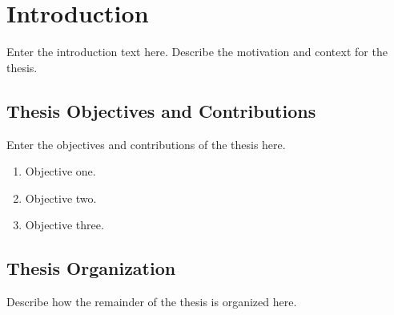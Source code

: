 
\newpage
{}



\chapter{Introduction}
\label{chap:introduction}

Enter the introduction text here. Describe the motivation and context for the thesis.

\section{Thesis Objectives and Contributions}
\label{sec:objectives}

Enter the objectives and contributions of the thesis here.

\begin{enumerate}
    \item Objective one.
    \item Objective two.
    \item Objective three.
\end{enumerate}

\section{Thesis Organization}
\label{sec:organization}

Describe how the remainder of the thesis is organized here.
